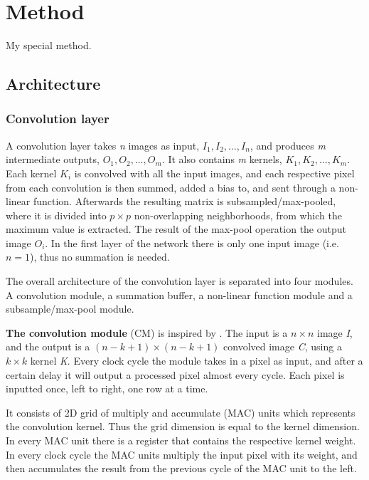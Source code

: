 \chapter{Method}

My special method. 

\section{Architecture}

\subsection {Convolution layer}

A convolution layer takes \textit{n} images as input, $ I_1, I_2, \dots, I_n $, and produces \textit{m} intermediate outputs, $O_1, O_2, \dots, O_m $. It also contains \textit{m} kernels, $ K_1, K_2, \dots, K_m $. Each kernel $ K_i $ is convolved with all the input images, and each respective pixel from each convolution is then summed, added a bias to, and sent through a non-linear function. Afterwards the resulting matrix is subsampled/max-pooled, where it is divided into $ p \times p $ non-overlapping neighborhoods, from which the maximum value is extracted. The result of the max-pool operation the output image $ O_i $. 
In the first layer of the network there is only one input image (i.e. $ n = 1 $), thus no summation is needed. 

The overall architecture of the convolution layer is separated into four modules. A convolution module, a summation buffer, a non-linear function module and a subsample/max-pool module.

\vspace*{1\baselineskip}
\textbf{The convolution module} (CM) is inspired by \cite{Farabet2009}. The input is a $ n \times n $ image \textit{I}, and the output is a $ (n-k+1) \times (n-k+1) $ convolved image \textit{C}, using a $ k \times k $ kernel \textit{K}. Every clock cycle the module takes in a pixel as input, and after a certain delay it will output a processed pixel almost every cycle. Each pixel is inputted once, left to right, one row at a time. 

It consists of 2D grid of multiply and accumulate (MAC) units which represents the convolution kernel. Thus the grid dimension is equal to the kernel dimension. In every MAC unit there is a register that contains the respective kernel weight. In every clock cycle the MAC units multiply the input pixel with its weight, and then accumulates the result from the previous cycle of the MAC unit to the left. 

